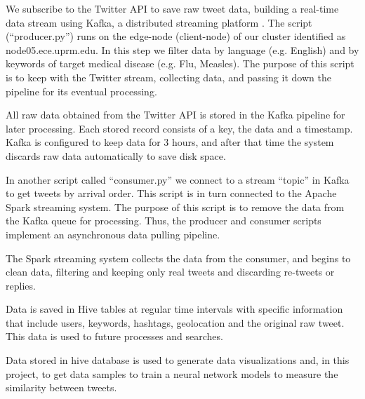 \documentclass[12pt]{report}
\begin{document}
\begin{steps}
	\item We subscribe to the Twitter \ac{API} to save raw tweet data, building a real-time data stream using Kafka, a distributed streaming platform \cite{Kafka2019}. The script (``producer.py'') runs on the edge-node (client-node) of our cluster identified as node05.ece.uprm.edu. In this step we filter data by language (e.g. English) and by keywords of target medical disease (e.g. Flu, Measles). The purpose of this script is to keep with  the Twitter stream, collecting data, and 
	passing it down the pipeline for its eventual processing.
	
	\item All raw data obtained from the Twitter \ac{API} is stored in the Kafka pipeline for later processing. Each stored record consists of a key, the data and a timestamp. Kafka is configured to keep data for 3 hours, and after that time the system discards raw data automatically to save disk space. 
	
	\item In another script called ``consumer.py'' we connect to a stream ``topic'' in Kafka to get tweets  by arrival order. This script is in turn  connected to 
	the Apache Spark streaming system. The purpose of this script is to remove the data from the Kafka queue for processing. Thus, the producer and consumer
	scripts implement an asynchronous	data pulling pipeline. 
	
	\item The Spark streaming system collects the data from the consumer, and begins to clean data, filtering and keeping only real tweets and discarding re-tweets or replies. %
	
	\item Data is saved in Hive tables at regular time intervals with specific information that include users, keywords, hashtags, geolocation and the original raw tweet. This data is used to future processes and searches.
	
	\item Data stored in hive database is used to generate data visualizations and, in this project, to get data samples to train a  neural network models to measure the similarity between tweets.
	
\end{steps}
\end{document}
